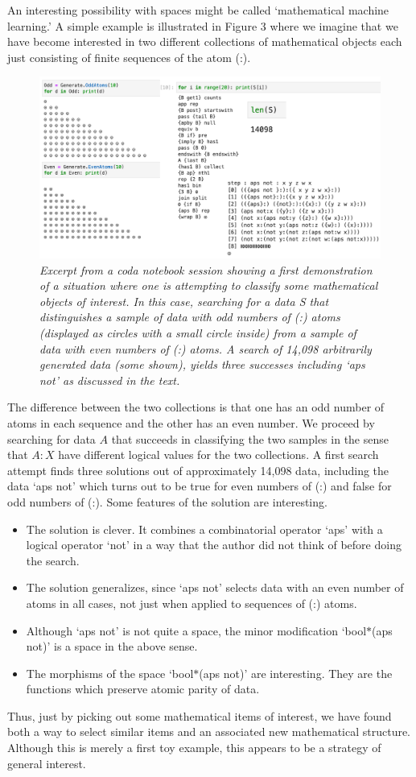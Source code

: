 \documentclass[11pt]{article}
\begin{document}
     An interesting possibility with spaces might be called `mathematical machine learning.'  A simple
example is illustrated in Figure 3 where we imagine that we have become interested in two different
collections of mathematical objects each just consisting of finite sequences of the atom (:).
\begin{figure}[h]
\centering
\includegraphics[width=1.0\textwidth]{machine_learning.png}
\caption{{\it Excerpt from a coda notebook session showing a first demonstration of a situation where one is 
attempting to classify some mathematical objects of interest.  In this case, searching for a data S that distinguishes a sample of
data with odd numbers of (:) atoms (displayed as circles with a small circle inside) from a sample of data with even numbers of (:) atoms.  
A search of 14,098 arbitrarily generated data (some shown), yields three successes including `aps not' as discussed in the text.}}
\end{figure}
The difference between the two collections is that one has an odd number of atoms in each sequence and
the other has an even number.  We proceed by searching for data $A$ that succeeds in classifying
the two samples in the sense that $A:X$ have different logical values for the two collections.   A first search attempt
finds three solutions out of approximately 14,098 data, including the data  `aps not' which turns out to be true for
even numbers of (:) and false for odd numbers of (:).
Some features of the solution are interesting.
\begin{itemize}
\item The solution is clever.  It combines a combinatorial operator `aps' with a logical operator `not'
in a way that the author did not think of before doing the search.
\item The solution generalizes, since `aps not' selects data with an even number of atoms in all cases,
not just when applied to sequences of (:) atoms.
\item Although `aps not' is not quite a space, the minor modification `bool$*$(aps not)' is a space
in the above sense.
\item The morphisms of the space `bool$*$(aps not)' are interesting.  They are the functions
which preserve atomic parity of data.
\end{itemize}
Thus, just by picking out some mathematical items of interest, we have found both a way to
select similar items and an associated new mathematical structure.
Although this is merely a first toy example, this appears to be a strategy of general interest.
\end{document}
